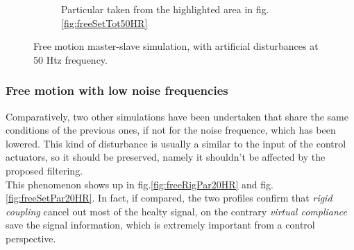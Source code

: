 \begin{figure}
\begin{subfigure}[h!]{1\linewidth}
		\caption{Particular taken from the highlighted area in fig.\ref{fig:freeSetTot50HR}}
		\label{fig:freeSetPar50HR}
	\end{subfigure}	
  \caption{ Free motion master-slave simulation, with artificial disturbances at
    50 Htz frequency. }
\end{figure}






\subsubsection{Free motion with low noise frequencies}

Comparatively, two other simulations have been undertaken that share the same
conditions of the previous ones, if not for the noise frequence, which has been lowered.
This kind of disturbance is usually a similar to the input of the control
actuators, so it should be preserved, namely it shouldn't be affected by the
proposed filtering.\\
This phenomenon shows up in fig.\ref{fig:freeRigPar20HR} and fig.\ref{fig:freeSetPar20HR}.
In fact, if compared, the two profiles confirm that \textsl{rigid coupling}
cancel out most of the healty signal, on the contrary \textsl{virtual
  compliance} save the signal information, which is extremely important from a
control perspective.

